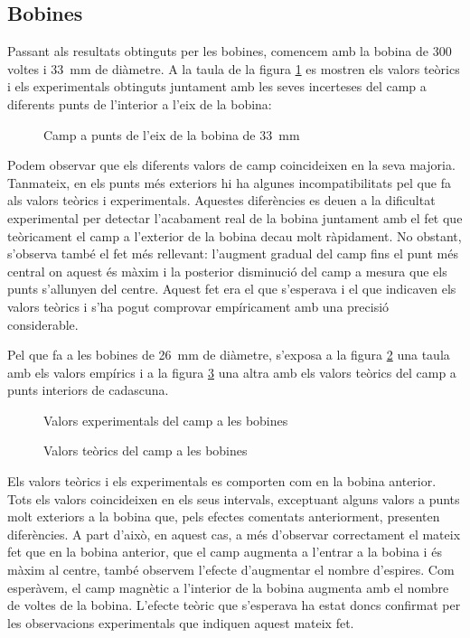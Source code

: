 \subsection{Bobines}\label{sec:bobines}
Passant als resultats obtinguts per les bobines, comencem amb la bobina de 300 voltes i \SI{33}{mm} de diàmetre. A la taula de la figura \cref{fig:bobina 33 mm} es mostren els valors teòrics i els experimentals obtinguts juntament amb les seves incerteses del camp a diferents punts de l'interior a l'eix de la bobina:

\begin{figure}[htb]
  \centering
  \caption{Camp a punts de l'eix de la bobina de \SI{33}{mm}}
  \label{fig:bobina 33 mm}
\end{figure}

Podem observar que els diferents valors de camp coincideixen en la seva majoria. Tanmateix, en els punts més exteriors hi ha algunes incompatibilitats pel que fa als valors teòrics i experimentals. Aquestes diferències es deuen a la dificultat experimental per detectar l'acabament real de la bobina juntament amb el fet que teòricament el camp a l'exterior de la bobina decau molt ràpidament. No obstant, s'observa també el fet més rellevant: l'augment gradual del camp fins el punt més central on aquest és màxim i la posterior disminució del camp a mesura que els punts s'allunyen del centre. Aquest fet era el que s'esperava i el que indicaven els valors teòrics i s'ha pogut comprovar empíricament amb una precisió considerable.

Pel que fa a les bobines de \SI{26}{mm} de diàmetre, s'exposa a la figura \cref{tab:camp experimentals} una taula amb els valors empírics i a la figura \cref{tab:camps teorics} una altra amb els valors teòrics del camp a punts interiors de cadascuna.

\begin{figure}[htb]
  \centering
  \caption{Valors experimentals del camp a les bobines}
  \label{tab:camp experimentals}
\end{figure}

\begin{figure}[htb]
  \centering
  \caption{Valors teòrics del camp a les bobines}
  \label{tab:camps teorics}
\end{figure}

Els valors teòrics i els experimentals es comporten com en la bobina anterior. Tots els valors coincideixen en els seus intervals, exceptuant alguns valors a punts molt exteriors a la bobina que, pels efectes comentats anteriorment, presenten diferències. A part d'això, en aquest cas, a més d'observar correctament el mateix fet que en la bobina anterior, que el camp augmenta a l'entrar a la bobina i és màxim al centre, també observem l'efecte d'augmentar el nombre d'espires. Com esperàvem, el camp magnètic a l'interior de la bobina augmenta amb el nombre de voltes de la bobina. L'efecte teòric que s'esperava ha estat doncs confirmat per les observacions experimentals que indiquen aquest mateix fet.

